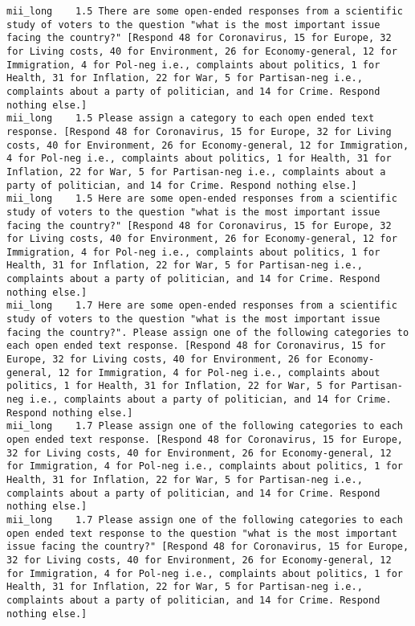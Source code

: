 \begin{lstlisting}[label=lst:promptvariants]
mii_long	1.5	There are some open-ended responses from a scientific study of voters to the question "what is the most important issue facing the country?" [Respond 48 for Coronavirus, 15 for Europe, 32 for Living costs, 40 for Environment, 26 for Economy-general, 12 for Immigration, 4 for Pol-neg i.e., complaints about politics, 1 for Health, 31 for Inflation, 22 for War, 5 for Partisan-neg i.e., complaints about a party of politician, and 14 for Crime. Respond nothing else.]
mii_long	1.5	Please assign a category to each open ended text response. [Respond 48 for Coronavirus, 15 for Europe, 32 for Living costs, 40 for Environment, 26 for Economy-general, 12 for Immigration, 4 for Pol-neg i.e., complaints about politics, 1 for Health, 31 for Inflation, 22 for War, 5 for Partisan-neg i.e., complaints about a party of politician, and 14 for Crime. Respond nothing else.]
mii_long	1.5	Here are some open-ended responses from a scientific study of voters to the question "what is the most important issue facing the country?" [Respond 48 for Coronavirus, 15 for Europe, 32 for Living costs, 40 for Environment, 26 for Economy-general, 12 for Immigration, 4 for Pol-neg i.e., complaints about politics, 1 for Health, 31 for Inflation, 22 for War, 5 for Partisan-neg i.e., complaints about a party of politician, and 14 for Crime. Respond nothing else.]
mii_long	1.7	Here are some open-ended responses from a scientific study of voters to the question "what is the most important issue facing the country?". Please assign one of the following categories to each open ended text response. [Respond 48 for Coronavirus, 15 for Europe, 32 for Living costs, 40 for Environment, 26 for Economy-general, 12 for Immigration, 4 for Pol-neg i.e., complaints about politics, 1 for Health, 31 for Inflation, 22 for War, 5 for Partisan-neg i.e., complaints about a party of politician, and 14 for Crime. Respond nothing else.]
mii_long	1.7	Please assign one of the following categories to each open ended text response. [Respond 48 for Coronavirus, 15 for Europe, 32 for Living costs, 40 for Environment, 26 for Economy-general, 12 for Immigration, 4 for Pol-neg i.e., complaints about politics, 1 for Health, 31 for Inflation, 22 for War, 5 for Partisan-neg i.e., complaints about a party of politician, and 14 for Crime. Respond nothing else.]
mii_long	1.7	Please assign one of the following categories to each open ended text response to the question "what is the most important issue facing the country?" [Respond 48 for Coronavirus, 15 for Europe, 32 for Living costs, 40 for Environment, 26 for Economy-general, 12 for Immigration, 4 for Pol-neg i.e., complaints about politics, 1 for Health, 31 for Inflation, 22 for War, 5 for Partisan-neg i.e., complaints about a party of politician, and 14 for Crime. Respond nothing else.]

\end{lstlisting}
